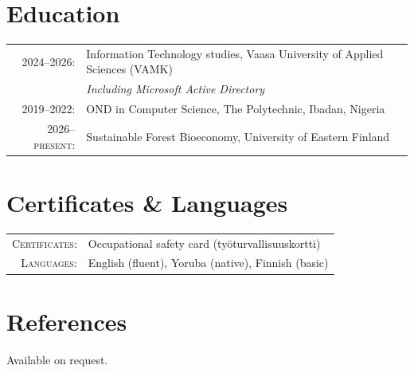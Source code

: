 \documentclass[a4paper,11pt]{article}
\begin{document}
\section{Education}
\begin{tabular}{rl}
  \textsc{2024--2026:}& Information Technology studies, Vaasa University of Applied Sciences (VAMK)\\
  & \footnotesize\itshape Including Microsoft Active Directory\\[0.3em]
  \textsc{2019--2022:}& OND in Computer Science, The Polytechnic, Ibadan, Nigeria\\[0.3em]
  \textsc{2026--present:}& Sustainable Forest Bioeconomy, University of Eastern Finland\\
\end{tabular}

\section{Certificates \& Languages}
\begin{tabular}{rl}
  \textsc{Certificates:}& Occupational safety card (työturvallisuuskortti)\\
  \textsc{Languages:}& English (fluent), Yoruba (native), Finnish (basic)\\
\end{tabular}

\section{References}
Available on request.
\end{document}

